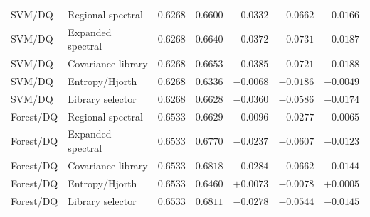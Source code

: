 \begin{longtable}{llrrrrr}
SVM/DQ & Regional spectral & $0.6268$ & $0.6600$ & $-0.0332$ & $-0.0662$ & $-0.0166$\\
SVM/DQ & Expanded spectral & $0.6268$ & $0.6640$ & $-0.0372$ & $-0.0731$ & $-0.0187$\\
SVM/DQ & Covariance library & $0.6268$ & $0.6653$ & $-0.0385$ & $-0.0721$ & $-0.0188$\\
SVM/DQ & Entropy/Hjorth & $0.6268$ & $0.6336$ & $-0.0068$ & $-0.0186$ & $-0.0049$\\
SVM/DQ & Library selector & $0.6268$ & $0.6628$ & $-0.0360$ & $-0.0586$ & $-0.0174$\\
Forest/DQ & Regional spectral & $0.6533$ & $0.6629$ & $-0.0096$ & $-0.0277$ & $-0.0065$\\
Forest/DQ & Expanded spectral & $0.6533$ & $0.6770$ & $-0.0237$ & $-0.0607$ & $-0.0123$\\
Forest/DQ & Covariance library & $0.6533$ & $0.6818$ & $-0.0284$ & $-0.0662$ & $-0.0144$\\
Forest/DQ & Entropy/Hjorth & $0.6533$ & $0.6460$ & $+0.0073$ & $-0.0078$ & $+0.0005$\\
Forest/DQ & Library selector & $0.6533$ & $0.6811$ & $-0.0278$ & $-0.0544$ & $-0.0145$\\
\end{longtable}
